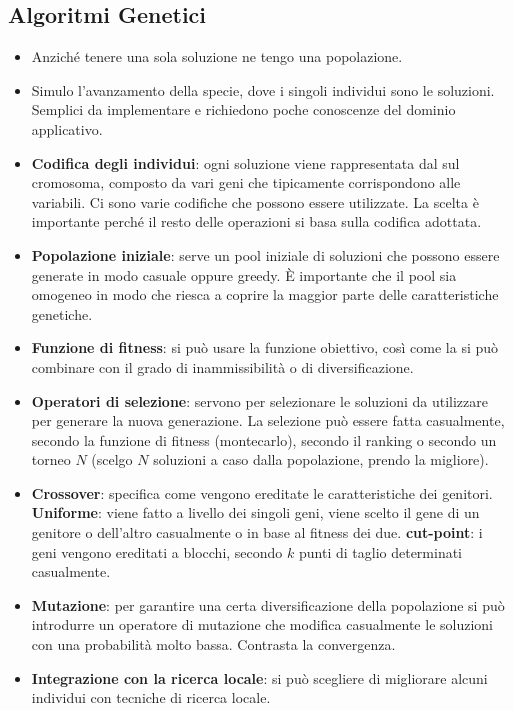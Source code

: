 \subsection{Algoritmi Genetici}

\begin{itemize}
	\item Anziché tenere una sola soluzione ne tengo una popolazione.
	\item Simulo l'avanzamento della specie, dove i singoli individui sono le soluzioni. Semplici da implementare e richiedono poche conoscenze del dominio applicativo.
	\item \textbf{Codifica degli individui}: ogni soluzione viene rappresentata dal sul cromosoma, composto da vari geni che tipicamente corrispondono alle variabili. Ci sono varie codifiche che possono essere utilizzate. La scelta è importante perché il resto delle operazioni si basa sulla codifica adottata.
	\item \textbf{Popolazione iniziale}: serve un pool iniziale di soluzioni che possono essere generate in modo casuale oppure greedy. \`E importante che il pool sia omogeneo in modo che riesca a coprire la maggior parte delle caratteristiche genetiche.
	\item \textbf{Funzione di fitness}: si può usare la funzione obiettivo, così come la si può combinare con il grado di inammissibilità o di diversificazione.
	\item \textbf{Operatori di selezione}: servono per selezionare le soluzioni da utilizzare per generare la nuova generazione. La selezione può essere fatta casualmente, secondo la funzione di fitness (montecarlo), secondo il ranking o secondo un torneo $N$ (scelgo $N$ soluzioni a caso dalla popolazione, prendo la migliore).
	\item \textbf{Crossover}: specifica come vengono ereditate le caratteristiche dei genitori. \textbf{Uniforme}: viene fatto a livello dei singoli geni, viene scelto il gene di un genitore o dell'altro casualmente o in base al fitness dei due. \textbf{cut-point}: i geni vengono ereditati a blocchi, secondo $k$ punti di taglio determinati casualmente. 
	\item \textbf{Mutazione}: per garantire una certa diversificazione della popolazione si può introdurre un operatore di mutazione che modifica casualmente le soluzioni con una probabilità molto bassa. Contrasta la convergenza.
	\item \textbf{Integrazione con la ricerca locale}: si può scegliere di migliorare alcuni individui con tecniche di ricerca locale.

\end{itemize}
